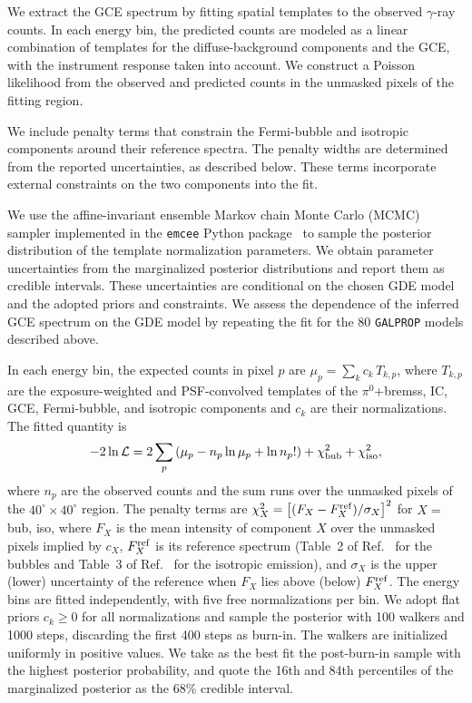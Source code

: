 \documentclass[superscriptaddress,
showpacs,preprintnumbers,nofootinbib,eqsecnum,amsmath,amssymb,aps,11pt, groupedaddress, floatfix]{revtex4-2}
\begin{document}
We extract the GCE spectrum by fitting spatial templates to the observed $\gamma$-ray counts.
In each energy bin, the predicted counts are modeled as a linear combination of templates for the diffuse-background components and the GCE, with the instrument response taken into account.
We construct a Poisson likelihood from the observed and predicted counts in the unmasked pixels of the fitting region.

We include penalty terms that constrain the Fermi-bubble and isotropic components around their reference spectra.
The penalty widths are determined from the reported uncertainties, as described below.
These terms incorporate external constraints on the two components into the fit.

We use the affine-invariant ensemble Markov chain Monte Carlo (MCMC) sampler implemented in the \texttt{emcee} Python package~\cite{Foreman_Mackey_2013} to sample the posterior distribution of the template normalization parameters.
We obtain parameter uncertainties from the marginalized posterior distributions and report them as credible intervals.
These uncertainties are conditional on the chosen GDE model and the adopted priors and constraints.
We assess the dependence of the inferred GCE spectrum on the GDE model by repeating the fit for the 80 \texttt{GALPROP} models described above. 

In each energy bin, the expected counts in pixel $p$ are $\mu_p=\sum_k c_k\,T_{k,p}$, where $T_{k,p}$ are the exposure-weighted and PSF-convolved templates of the $\pi^0$+bremss, IC, GCE, Fermi-bubble, and isotropic components and $c_k$ are their normalizations. The fitted quantity is
\begin{align}
-2\ln\mathcal{L}=2\sum_{p}\left(\mu_p-n_p\ln\mu_p+\ln n_p!\right)+\chi^2_{\rm bub}+\chi^2_{\rm iso},
\end{align}
where $n_p$ are the observed counts and the sum runs over the unmasked pixels of the $40^\circ\times40^\circ$ region. The penalty terms are $\chi^2_X=\left[(F_X-F_X^{\rm ref})/\sigma_X\right]^2$ for $X=$ bub, iso, where $F_X$ is the mean intensity of component $X$ over the unmasked pixels implied by $c_X$, $F_X^{\rm ref}$ is its reference spectrum (Table~2 of Ref.~\cite{Fermi-LAT:2014sfa} for the bubbles and Table~3 of Ref.~\cite{Fermi-LAT:2014ryh} for the isotropic emission), and $\sigma_X$ is the upper (lower) uncertainty of the reference when $F_X$ lies above (below) $F_X^{\rm ref}$. The energy bins are fitted independently, with five free normalizations per bin. We adopt flat priors $c_k\geq0$ for all normalizations and sample the posterior with 100 walkers and 1000 steps, discarding the first 400 steps as burn-in. The walkers are initialized uniformly in positive values. We take as the best fit the post-burn-in sample with the highest posterior probability, and quote the 16th and 84th percentiles of the marginalized posterior as the 68\% credible interval.
\end{document}
